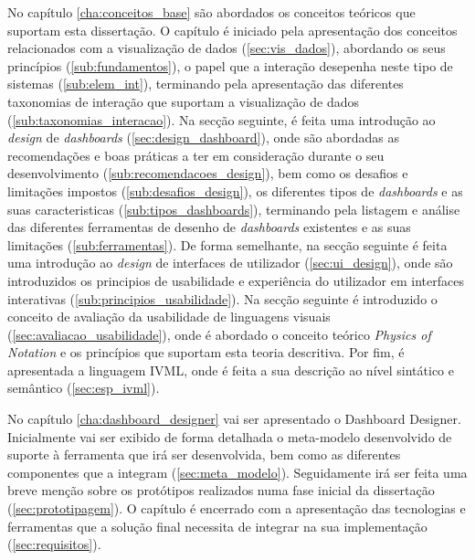 No capítulo \ref{cha:conceitos_base} são abordados os conceitos teóricos que suportam esta dissertação. O capítulo é iniciado pela apresentação dos conceitos relacionados com a visualização de dados (\ref{sec:vis_dados}), abordando os seus princípios (\ref{sub:fundamentos}), o papel que a interação desepenha neste tipo de sistemas (\ref{sub:elem_int}), terminando pela apresentação das diferentes taxonomias de interação que suportam a visualização de dados (\ref{sub:taxonomias_interacao}). Na secção seguinte, é feita uma introdução ao \textit{design} de \textit{dashboards} (\ref{sec:design_dashboard}), onde são abordadas as recomendações e boas práticas a ter em consideração durante o seu desenvolvimento (\ref{sub:recomendacoes_design}), bem como os desafios e limitações impostos (\ref{sub:desafios_design}), os diferentes tipos de \textit{dashboards} e as suas caracteristicas (\ref{sub:tipos_dashboards}), terminando pela listagem e análise das diferentes ferramentas de desenho de \textit{dashboards} existentes e as suas limitações (\ref{sub:ferramentas}). De forma semelhante, na secção seguinte é feita uma introdução ao \textit{design} de interfaces de utilizador (\ref{sec:ui_design}), onde são introduzidos os principios de usabilidade e experiência do utilizador em interfaces interativas (\ref{sub:principios_usabilidade}). Na secção seguinte é introduzido o conceito de avaliação da usabilidade de linguagens visuais (\ref{sec:avaliacao_usabilidade}), onde é abordado o conceito teórico \textit{Physics of Notation} e os princípios que suportam esta teoria descritiva. Por fim, é apresentada a linguagem IVML, onde é feita a sua descrição ao nível sintático e semântico (\ref{sec:esp_ivml}).

No capítulo \ref{cha:dashboard_designer} vai ser apresentado o Dashboard Designer. Inicialmente vai ser exibido de forma detalhada o meta-modelo desenvolvido de suporte à ferramenta que irá ser desenvolvida, bem como as diferentes componentes que a integram (\ref{sec:meta_modelo}). Seguidamente irá ser feita uma breve menção sobre os protótipos realizados numa fase inicial da dissertação (\ref{sec:prototipagem}). O capítulo é encerrado com a apresentação das tecnologias e ferramentas que a solução final necessita de integrar na sua implementação (\ref{sec:requisitos}).


